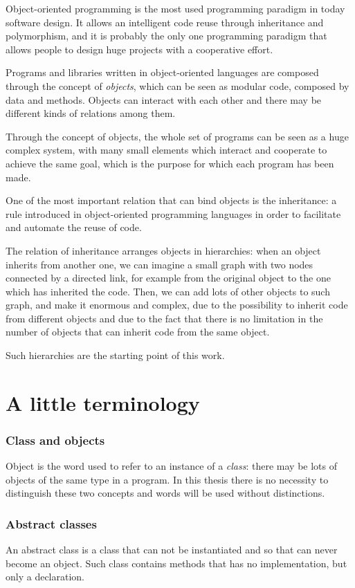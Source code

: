 Object-oriented programming is the most used programming paradigm in today software design. It allows an intelligent code reuse through inheritance and polymorphism, and it is probably the only one programming paradigm that allows people to design huge projects with a cooperative effort.

Programs and libraries written in object-oriented languages are composed through the concept of \textit{objects}, which can be seen as modular code, composed by data and methods. Objects can interact with each other and there may be different kinds of relations among them.

Through the concept of objects, the whole set of programs can be seen as a huge complex system, with many small elements which interact and cooperate to achieve the same goal, which is the purpose for which each program has been made.

One of the most important relation that can bind objects is the inheritance: a rule introduced in object-oriented programming languages in order to facilitate and automate the reuse of code.

The relation of inheritance arranges objects in hierarchies: when an object inherits from another one, we can imagine a small graph with two nodes connected by a directed link, for example from the original object to the one which has inherited the code. Then, we can add lots of other objects to such graph, and make it enormous and complex, due to the possibility to inherit code from different objects and due to the fact that there is no limitation in the number of objects that can inherit code from the same object.

Such hierarchies are the starting point of this work.

\section{A little terminology}
\subsubsection{Class and objects}
Object is the word used to refer to an instance of a \textit{class}: there may be lots of objects of the same type in a program. In this thesis there is no necessity to distinguish these two concepts and words will be used without distinctions.

\subsubsection{Abstract classes}
An abstract class is a class that can not be instantiated and so that can never become an object. Such class contains methods that has no implementation, but only a declaration.


